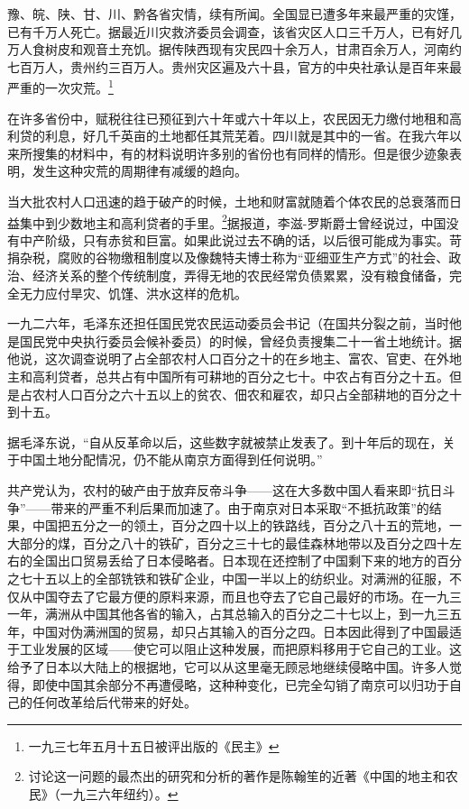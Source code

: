 \documentclass[10pt]{book}
\begin{document}
豫、皖、陕、甘、川、黔各省灾情，续有所闻。全国显已遭多年来最严重的灾馑，已有千万人死亡。据最近川灾救济委员会调查，该省灾区人口三千万人，已有好几万人食树皮和观音土充饥。据传陕西现有灾民四十余万人，甘肃百余万人，河南约七百万人，贵州约三百万人。贵州灾区遍及六十县，官方的中央社承认是百年来最严重的一次灾荒。\footnote{一九三七年五月十五日被评出版的《民主》}

在许多省份中，赋税往往已预征到六十年或六十年以上，农民因无力缴付地租和高利贷的利息，好几千英亩的土地都任其荒芜着。四川就是其中的一省。在我六年以来所搜集的材料中，有的材料说明许多别的省份也有同样的情形。但是很少迹象表明，发生这种灾荒的周期律有减缓的趋向。

当大批农村人口迅速的趋于破产的时候，土地和财富就随着个体农民的总衰落而日益集中到少数地主和高利贷者的手里。\footnote{讨论这一问题的最杰出的研究和分析的著作是陈翰笙的近著《中国的地主和农民》（一九三六年纽约）。}据报道，李滋-罗斯爵士曾经说过，中国没有中产阶级，只有赤贫和巨富。如果此说过去不确的话，以后很可能成为事实。苛捐杂税，腐败的谷物缴租制度以及像魏特夫博士称为“亚细亚生产方式”的社会、政治、经济关系的整个传统制度，弄得无地的农民经常负债累累，没有粮食储备，完全无力应付旱灾、饥馑、洪水这样的危机。

一九二六年，毛泽东还担任国民党农民运动委员会书记（在国共分裂之前，当时他是国民党中央执行委员会候补委员）的时候，曾经负责搜集二十一省土地统计。据他说，这次调查说明了占全部农村人口百分之十的在乡地主、富农、官吏、在外地主和高利贷者，总共占有中国所有可耕地的百分之七十。中农占有百分之十五。但是占农村人口百分之六十五以上的贫农、佃农和雇农，却只占全部耕地的百分之十到十五。

据毛泽东说，“自从反革命以后，这些数字就被禁止发表了。到十年后的现在，关于中国土地分配情况，仍不能从南京方面得到任何说明。”

共产党认为，农村的破产由于放弃反帝斗争——这在大多数中国人看来即“抗日斗争”——带来的严重不利后果而加速了。由于南京对日本采取“不抵抗政策”的结果，中国把五分之一的领土，百分之四十以上的铁路线，百分之八十五的荒地，一大部分的煤，百分之八十的铁矿，百分之三十七的最佳森林地带以及百分之四十左右的全国出口贸易丢给了日本侵略者。日本现在还控制了中国剩下来的地方的百分之七十五以上的全部铣铁和铁矿企业，中国一半以上的纺织业。对满洲的征服，不仅从中国夺去了它最方便的原料来源，而且也夺去了它自己最好的市场。在一九三一年，满洲从中国其他各省的输入，占其总输入的百分之二十七以上，到一九三五年，中国对伪满洲国的贸易，却只占其输入的百分之四。日本因此得到了中国最适于工业发展的区域——使它可以阻止这种发展，而把原料移用于它自己的工业。这给予了日本以大陆上的根据地，它可以从这里毫无顾忌地继续侵略中国。许多人觉得，即使中国其余部分不再遭侵略，这种种变化，已完全勾销了南京可以归功于自己的任何改革给后代带来的好处。
\end{document}
